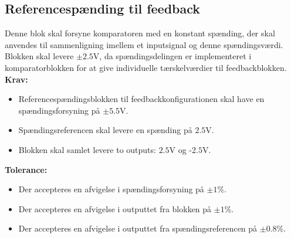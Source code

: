 \subsection{Referencespænding til feedback}\label{Ref_Kompar_Afs}
Denne blok skal forsyne komparatoren med en konstant spænding, der skal anvendes til sammenligning imellem et inputsignal og denne spændingsværdi.
Blokken skal levere $\pm2.5$V, da spændingsdelingen er implementeret i komparatorblokken for at give individuelle tærskelværdier til feedbackblokken. \\ 
\noindent\textbf{Krav:}
\begin{itemize}
	\item Referencespændingsblokken til feedbackkonfigurationen skal have en spændingsforsyning på $\pm5.5$V.
	\item Spændingsreferencen skal levere en spænding på $2.5$V.
	\item Blokken skal samlet levere to outputs: $2.5$V og -$2.5$V.
\end{itemize}
\noindent \textbf{Tolerance:}
\begin{itemize}
	\item Der accepteres en afvigelse i spændingsforsyning på $\pm1\%$.
	\item Der accepteres en afvigelse i outputtet fra blokken på $\pm1\%$.
	\item Der accepteres en afvigelse i outputtet fra spændingsreferencen på $\pm0.8\%$. 
\end{itemize}
